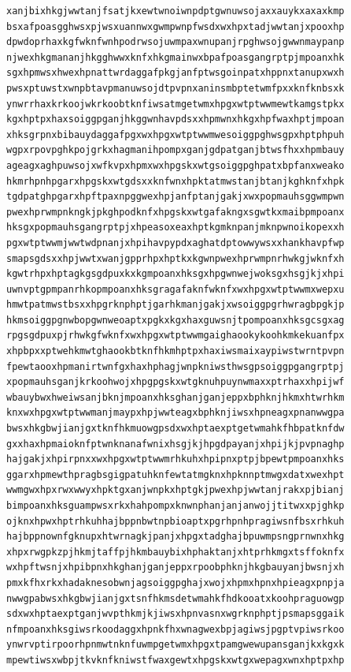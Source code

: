 \documentclass[11pt,letterpaper]{exam}
\begin{document}
\begin{questions}
\begin{verbatim}
xanjbixhkgjwwtanjfsatjkxewtwnoiwnpdptgwnuwsojaxxauykxaxaxkmp
bsxafpoasgghwsxpjwsxuannwxgwmpwnpfwsdxwxhpxtadjwwtanjxpooxhp
dpwdoprhaxkgfwknfwnhpodrwsojuwmpaxwnupanjrpghwsojgwwnmaypanp
njwexhkgmananjhkgghwwxknfxhkgmainwxbpafpoasgangrptpjmpoanxhk
sgxhpmwsxhwexhpnattwrdaggafpkgjanfptwsgoinpatxhppnxtanupxwxh
pwsxptuwstxwnpbtavpmanuwsojdtpvpnxaninsmbptetwmfpxxknfknbsxk
ynwrrhaxkrkoojwkrkoobtknfiwsatmgetwmxhpgxwtptwwmewtkamgstpkx
kgxhptpxhaxsoiggpganjhkggwnhavpdsxxhpmwnxhkgxhpfwaxhptjmpoan
xhksgrpnxbibauydaggafpgxwxhpgxwtptwwmwesoiggpghwsgpxhptphpuh
wgpxrpovpghkpojgrkxhagmanihpompxganjgdpatganjbtwsfhxxhpmbauy
ageagxaghpuwsojxwfkvpxhpmxwxhpgskxwtgsoiggpghpatxbpfanxweako
hkmrhpnhpgarxhpgskxwtgdsxxknfwnxhpktatmwstanjbtanjkghknfxhpk
tgdpatghpgarxhpftpaxnpggwexhpjanfptanjgakjxwxpopmauhsggwmpwn
pwexhprwmpnkngkjpkghpodknfxhpgskxwtgafakngxsgwtkxmaibpmpoanx
hksgxpopmauhsgangrptpjxhpeasoxeaxhptkgmknpanjmknpwnoikopexxh
pgxwtptwwmjwwtwdpnanjxhpihavpypdxaghatdptowwywsxxhankhavpfwp
smapsgdsxxhpjwwtxwanjgpprhpxhptkxkgwnpwexhprwmpnrhwkgjwknfxh
kgwtrhpxhptagkgsgdpuxkxkgmpoanxhksgxhpgwnwejwoksgxhsgjkjxhpi
uwnvptgpmpanrhkopmpoanxhksgragafaknfwknfxwxhpgxwtptwwmxwepxu
hmwtpatmwstbsxxhpgrknphptjgarhkmanjgakjxwsoiggpgrhwragbpgkjp
hkmsoiggpgnwbopgwnweoaptxpgkxkgxhaxguwsnjtpompoanxhksgcsgxag
rpgsgdpuxpjrhwkgfwknfxwxhpgxwtptwwmgaighaookykoohkmkekuanfpx
xhpbpxxptwehkmwtghaookbtknfhkmhptpxhaxiwsmaixaypiwstwrntpvpn
fpewtaooxhpmanirtwnfgxhaxhphagjwnpkniwsthwsgpsoiggpgangrptpj
xpopmauhsganjkrkoohwojxhpgpgskxwtgknuhpuynwmaxxptrhaxxhpijwf
wbauybwxhweiwsanjbknjmpoanxhksghanjganjeppxbphknjhkmxhtwrhkm
knxwxhpgxwtptwwmanjmaypxhpjwwteagxbphknjiwsxhpneagxpnanwwgpa
bwsxhkgbwjianjgxtknfhkmuowgpsdxwxhptaexptgetwmahkfhbpatknfdw
gxxhaxhpmaioknfptwnknanafwnixhsgjkjhpgdpayanjxhpijkjpvpnaghp
hajgakjxhpirpnxxwxhpgxwtptwwmrhkuhxhpipnxptpjbpewtpmpoanxhks
ggarxhpmewthpragbsgigpatuhknfewtatmgknxhpknnptmwgxdatxwexhpt
wwmgwxhpxrwxwwyxhpktgxanjwnpkxhptgkjpwexhpjwwtanjrakxpjbianj
bimpoanxhksguampwsxrkxhahpompxknwnphanjanjanwojjtitwxxpjghkp
ojknxhpwxhptrhkuhhajbppnbwtnpbioaptxpgrhpnhpragiwsnfbsxrhkuh
hajbppnownfgknupxhtwrnagkjpanjxhpgxtadghajbpuwmpsngprnwnxhkg
xhpxrwgpkzpjhkmjtaffpjhkmbauybixhphaktanjxhtprhkmgxtsffoknfx
wxhpftwsnjxhpibpnxhkghanjganjeppxrpoobphknjhkgbauyanjbwsnjxh
pmxkfhxrkxhadaknesobwnjagsoiggpghajxwojxhpmxhpnxhpieagxpnpja
nwwgpabwsxhkgbwjianjgxtsnfhkmsdetwmahkfhdkooatxkoohpraguowgp
sdxwxhptaexptganjwvpthkmjkjiwsxhpnvasnxwgrknphptjpsmapsggaik
nfmpoanxhksgiwsrkoodaggxhpnkfhxwnagwexbpjagiwsjpgptvpiwsrkoo
ynwrvptirpoorhpnmwtnknfuwmpgetwmxhpgxtpamgwewupansganjkxkgxk
mpewtiwsxwbpjtkvknfkniwstfwaxgewtxhpgskxwtgxwepagxwnxhptpxhp

\end{verbatim}
\end{questions}
\end{document}
